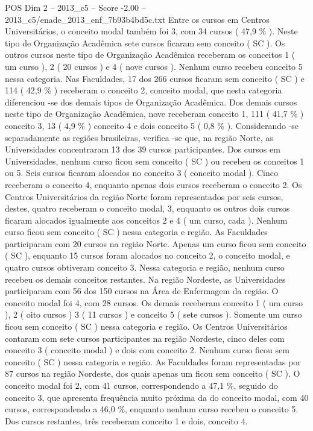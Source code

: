 \begin{textsample}{POS Dim 2 – 2013\_c5 – Score -2.00 – 2013\_c5/enade\_2013\_enf\_7b93b4bd5c.txt}
Entre os cursos em Centros Universitários, o conceito modal também foi 3, com 34 cursos ( 47,9 \% ).
Neste tipo de Organização Acadêmica sete cursos ficaram sem conceito ( SC ).
Os outros cursos neste tipo de Organização Acadêmica receberam os conceitos 1 ( um curso ), 2 ( 20 cursos ) e 4 ( nove cursos ).
Nenhum curso recebeu conceito 5 nessa categoria.
Nas Faculdades, 17 dos 266 cursos ficaram sem conceito ( SC ) e 114 ( 42,9 \% ) receberam o conceito 2, conceito modal, que nesta categoria diferenciou -se dos demais tipos de Organização Acadêmica.
Dos demais cursos neste tipo de Organização Acadêmica, nove receberam conceito 1, 111 ( 41,7 \% ) conceito 3, 13 ( 4,9 \% ) conceito 4 e dois conceito 5 ( 0,8 \% ).
Considerando -se separadamente as regiões brasileiras, verifica -se que, na região Norte, as Universidades concentraram 13 dos 39 cursos participantes.
Dos cursos em Universidades, nenhum curso ficou sem conceito ( SC ) ou recebeu os conceitos 1 ou 5.
Seis cursos ficaram alocados no conceito 3 ( conceito modal ).
Cinco receberam o conceito 4, enquanto apenas dois cursos receberam o conceito 2.
Os Centros Universitários da região Norte foram representados por seis cursos, destes, quatro receberam o conceito modal, 3, enquanto os outros dois cursos ficaram alocados igualmente aos conceitos 2 e 4 ( um curso, cada ).
Nenhum curso ficou sem conceito ( SC ) nessa categoria e região.
As Faculdades participaram com 20 cursos na região Norte.
Apenas um curso ficou sem conceito ( SC ), enquanto 15 cursos foram alocados no conceito 2, o conceito modal, e quatro cursos obtiveram conceito 3.
Nessa categoria e região, nenhum curso recebeu os demais conceitos restantes.
Na região Nordeste, as Universidades participaram com 56 dos 150 cursos na Área de Enfermagem da região.
O conceito modal foi 4, com 28 cursos.
Os demais receberam conceito 1 ( um curso ), 2 ( oito cursos ) 3 ( 11 cursos ) e conceito 5 ( sete cursos ).
Somente um curso ficou sem conceito ( SC ) nessa categoria e região.
Os Centros Universitários contaram com sete cursos participantes na região Nordeste, cinco deles com conceito 3 ( conceito modal ) e dois com conceito 2.
Nenhum curso ficou sem conceito ( SC ) nessa categoria e região.
As Faculdades foram representadas por 87 cursos na região Nordeste, dos quais apenas um ficou sem conceito ( SC ).
O conceito modal foi 2, com 41 cursos, correspondendo a 47,1 \%, seguido do conceito 3, que apresenta frequência muito próxima da do conceito modal, com 40 cursos, correspondendo a 46,0 \%, enquanto nenhum curso recebeu o conceito 5.
Dos cursos restantes, três receberam conceito 1 e dois, conceito 4.

\end{textsample}
